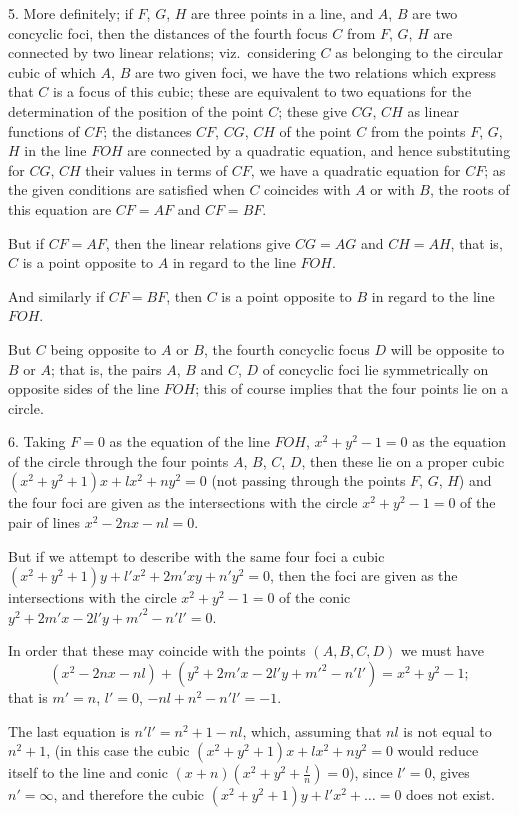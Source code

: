 \documentclass[11pt,a4paper]{article}
\theoremstyle{plain}
\theoremstyle{definition}
\theoremstyle{remark}
\begin{document}
5. More definitely; if $F$, $G$, $H$ are three points in a line, and $A$, $B$ are two concyclic foci, then the distances of the fourth focus $C$ from $F$, $G$, $H$ are connected by two linear relations; viz.\ considering $C$ as belonging to the circular cubic of which $A$, $B$ are two given foci, we have the two relations which express that $C$ is a focus of this cubic; these are equivalent to two equations for the determination of the position of the point $C$; these give $CG$, $CH$ as linear functions of $CF$; the distances $CF$, $CG$, $CH$ of the point $C$ from the points $F$, $G$, $H$ in the line $FOH$ are connected by a quadratic equation, and hence substituting for $CG$, $CH$ their values in terms of $CF$, we have a quadratic equation for $CF$; as the given conditions are satisfied when $C$ coincides with $A$ or with $B$, the roots of this equation are $CF=AF$ and $CF=BF$.

But if $CF=AF$, then the linear relations give $CG=AG$ and $CH=AH$, that is, $C$ is a point opposite to $A$ in regard to the line $FOH$.

And similarly if $CF=BF$, then $C$ is a point opposite to $B$ in regard to the line $FOH$.

But $C$ being opposite to $A$ or $B$, the fourth concyclic focus $D$ will be opposite to $B$ or $A$; that is, the pairs $A$, $B$ and $C$, $D$ of concyclic foci lie symmetrically on opposite sides of the line $FOH$; this of course implies that the four points lie on a circle.


6. Taking $F=0$ as the equation of the line $FOH$, $x^{2}+y^{2}-1=0$ as the equation of the circle through the four points $A$, $B$, $C$, $D$, then these lie on a proper cubic $(x^{2}+y^{2}+1)x+lx^{2}+ny^{2}=0$ (not passing through the points $F$, $G$, $H$) and the four foci are given as the intersections with the circle $x^{2}+y^{2}-1=0$ of the pair of lines $x^{2}-2nx-nl=0$.

But if we attempt to describe with the same four foci a cubic $(x^{2}+y^{2}+1)y+l'x^{2}+2m'xy+n'y^{2}=0$, then the foci are given as the intersections with the circle $x^{2}+y^{2}-1=0$ of the conic $y^{2}+2m'x-2l'y+m'^{2}-n'l'=0$.

In order that these may coincide with the points $(A,B,C,D)$ we must have
\[
(x^{2}-2nx-nl)+(y^{2}+2m'x-2l'y+m'^{2}-n'l')=x^{2}+y^{2}-1;
\]
that is $m'=n$, $l'=0$, $-nl+n^{2}-n'l'=-1$.

The last equation is $n'l'=n^{2}+1-nl$, which, assuming that $nl$ is not equal to $n^{2}+1$, (in this case the cubic $(x^{2}+y^{2}+1)x+lx^{2}+ny^{2}=0$ would reduce itself to the line and conic $(x+n)(x^{2}+y^{2}+\frac{l}{n})=0$), since $l'=0$, gives $n'=\infty$, and therefore the cubic $(x^{2}+y^{2}+1)y+l'x^{2}+\dots=0$ does not exist.
\end{document}
